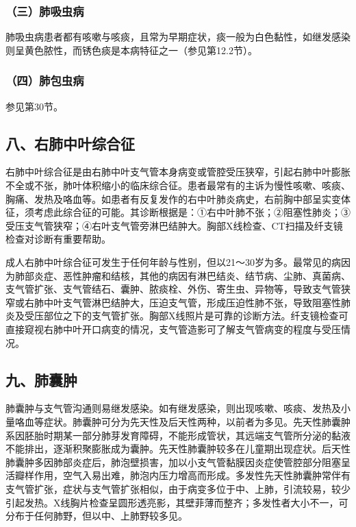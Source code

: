 \subsubsection{（三）肺吸虫病}

肺吸虫病患者都有咳嗽与咳痰，且常为早期症状，痰一般为白色黏性，如继发感染则呈黄色脓性，而锈色痰是本病特征之一（参见第12.2节）。

\subsubsection{（四）肺包虫病}

参见第30节。

\subsection{八、右肺中叶综合征}

右肺中叶综合征是由右肺中叶支气管本身病变或管腔受压狭窄，引起右肺中叶膨胀不全或不张，肺叶体积缩小的临床综合征。患者最常有的主诉为慢性咳嗽、咳痰、胸痛、发热及咯血等。如患者有反复发作的右中叶肺炎病史，右前胸中部呈实变体征，须考虑此综合征的可能。其诊断根据是：①右中叶肺不张；②阻塞性肺炎；③受压支气管狭窄；④右叶支气管旁淋巴结肿大。胸部X线检查、CT扫描及纤支镜检查对诊断有重要帮助。

成人右肺中叶综合征可发生于任何年龄与性别，但以21～30岁为多。最常见的病因为肺部炎症、恶性肿瘤和结核，其他的病因有淋巴结炎、结节病、尘肺、真菌病、支气管扩张、支气管结石、囊肿、脓痰栓、外伤、寄生虫、异物等，导致支气管狭窄或右肺中叶支气管淋巴结肿大，压迫支气管，形成压迫性肺不张，导致阻塞性肺炎及受压部位之下的支气管扩张。胸部X线照片是可靠的诊断方法。纤支镜检查可直接窥视右肺中叶开口病变的情况，支气管造影可了解支气管病变的程度与受压情况。

\subsection{九、肺囊肿}

肺囊肿与支气管沟通则易继发感染。如有继发感染，则出现咳嗽、咳痰、发热及小量咯血等症状。肺囊肿可分为先天性及后天性两种，以前者为多见。先天性肺囊肿系因胚胎时期某一部分肺芽发育障碍，不能形成管状，其远端支气管所分泌的黏液不能排出，逐渐积聚膨胀成为囊肿。先天性肺囊肿较多在儿童期出现症状。后天性肺囊肿多因肺部炎症后，肺泡壁损害，加以小支气管黏膜因炎症使管腔部分阻塞呈活瓣样作用，空气入易出难，肺泡内压力增高而形成。多发性先天性肺囊肿常伴有支气管扩张，症状与支气管扩张相似，由于病变多位于中、上肺，引流较易，较少引起发热。X线胸片检查呈圆形透亮影，其壁菲薄而整齐；多发性者大小不一，可分布于任何肺野，但以中、上肺野较多见。

